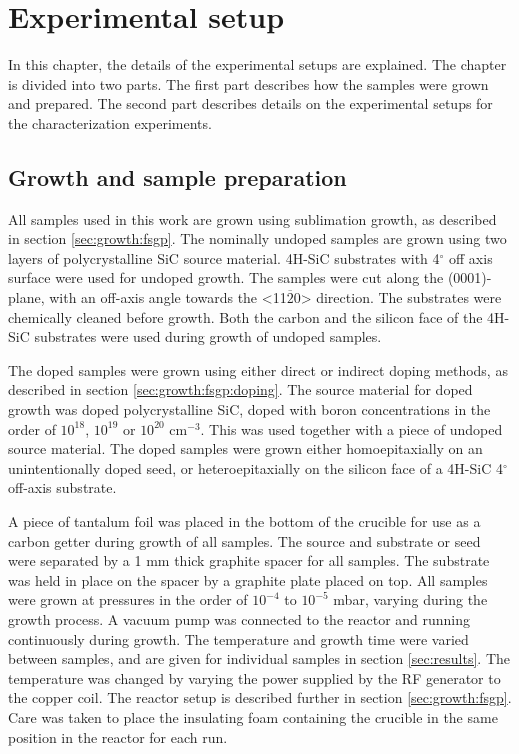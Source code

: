 
\chapter{Experimental setup}
\label{sec:experimental}
In this chapter, the details of the experimental setups are explained. The chapter is divided into two parts. The first part describes how the samples were grown and prepared. The second part describes details on the experimental setups for the characterization experiments. 

\section{Growth and sample preparation}
\label{sec:experimental:samples}
All samples used in this work are grown using sublimation growth, as described in section \ref{sec:growth:fsgp}. The nominally undoped samples are grown using two layers of polycrystalline SiC source material. 4H-SiC substrates with 4$^\circ$ off axis surface were used for undoped growth. The samples were cut along the (0001)-plane, with an off-axis angle towards the <11$\overline{2}$0> direction. The substrates were chemically cleaned before growth. Both the carbon and the silicon face of the 4H-SiC substrates were used during growth of undoped samples. 

The doped samples were grown using either direct or indirect doping methods, as described in section \ref{sec:growth:fsgp:doping}. The source material for doped growth was doped polycrystalline SiC, doped with boron concentrations in the order of $10^{18}$, $10^{19}$ or $10^{20}$ cm$^{-3}$. This was used together with a piece of undoped source material. The doped samples were grown either homoepitaxially on an unintentionally doped seed, or heteroepitaxially on the silicon face of a 4H-SiC 4$^\circ$ off-axis substrate. 

A piece of tantalum foil was placed in the bottom of the crucible for use as a carbon getter during growth of all samples. The source and substrate or seed were separated by a 1 mm thick graphite spacer for all samples. The substrate was held in place on the spacer by a graphite plate placed on top. All samples were grown at pressures in the order of $10^{-4}$ to $10^{-5}$ mbar, varying during the growth process. A vacuum pump was connected to the reactor and running continuously during growth. The temperature and growth time were varied between samples, and are given for individual samples in section \ref{sec:results}. The temperature was changed by varying the power supplied by the RF generator to the copper coil. The reactor setup is described further in section \ref{sec:growth:fsgp}. Care was taken to place the insulating foam containing the crucible in the same position in the reactor for each run. 

